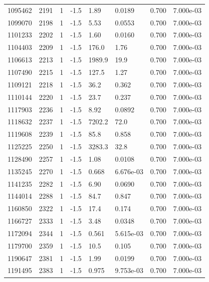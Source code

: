 \documentclass[preview]{standalone}
\begin{document}
{{{{{{{{{{{{\begin{tabular}{L{1.2cm}C{1.2cm} C{0.3cm}C{0.5cm} C{1.4cm}C{1.4cm} C{1.4cm}C{1.4cm}}
  1095462  &  2191  & 1     & -1.5 &  1.89  & 0.0189  & 0.700 &  7.000e-03   \\ 
  1099070  &  2198  & 1     & -1.5 &  5.53  & 0.0553  & 0.700 &  7.000e-03   \\ 
  1101233  &  2202  & 1     & -1.5 &  1.60  & 0.0160  & 0.700 &  7.000e-03   \\ 
  1104403  &  2209  & 1     & -1.5 &  176.0  & 1.76  & 0.700 &  7.000e-03   \\ 
  1106613  &  2213  & 1     & -1.5 &  1989.9  & 19.9  & 0.700 &  7.000e-03   \\ 
  1107490  &  2215  & 1     & -1.5 &  127.5  & 1.27  & 0.700 &  7.000e-03   \\ 
  1109121  &  2218  & 1     & -1.5 &  36.2  & 0.362  & 0.700 &  7.000e-03   \\ 
  1110144  &  2220  & 1     & -1.5 &  23.7  & 0.237  & 0.700 &  7.000e-03   \\ 
  1117903  &  2236  & 1     & -1.5 &  8.92  & 0.0892  & 0.700 &  7.000e-03   \\ 
  1118632  &  2237  & 1     & -1.5 &  7202.2  & 72.0  & 0.700 &  7.000e-03   \\ 
  1119608  &  2239  & 1     & -1.5 &  85.8  & 0.858  & 0.700 &  7.000e-03   \\ 
  1125225  &  2250  & 1     & -1.5 &  3283.3  & 32.8  & 0.700 &  7.000e-03   \\ 
  1128490  &  2257  & 1     & -1.5 &  1.08  & 0.0108  & 0.700 &  7.000e-03   \\ 
  1135245  &  2270  & 1     & -1.5 &  0.668  & 6.676e-03  & 0.700 &  7.000e-03   \\ 
  1141235  &  2282  & 1     & -1.5 &  6.90  & 0.0690  & 0.700 &  7.000e-03   \\ 
  1144014  &  2288  & 1     & -1.5 &  84.7  & 0.847  & 0.700 &  7.000e-03   \\ 
  1160850  &  2322  & 1     & -1.5 &  17.4  & 0.174  & 0.700 &  7.000e-03   \\ 
  1166727  &  2333  & 1     & -1.5 &  3.48  & 0.0348  & 0.700 &  7.000e-03   \\ 
  1172094  &  2344  & 1     & -1.5 &  0.561  & 5.615e-03  & 0.700 &  7.000e-03   \\ 
  1179700  &  2359  & 1     & -1.5 &  10.5  & 0.105  & 0.700 &  7.000e-03   \\ 
  1190647  &  2381  & 1     & -1.5 &  1.99  & 0.0199  & 0.700 &  7.000e-03   \\ 
  1191495  &  2383  & 1     & -1.5 &  0.975  & 9.753e-03  & 0.700 &  7.000e-03   \\ 

\end{tabular}}}}}}}}}}}}}
\end{document}
